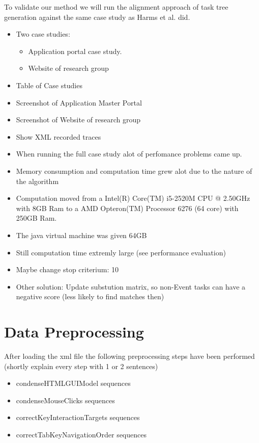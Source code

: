 To validate our method we will run the alignment approach of task tree generation against the same case study as Harms et al. did.

\begin{itemize}
	
	\item Two case studies: 
		\begin{itemize}
			\item Application portal case study. 
			\item Website of research group
		\end{itemize}
	\item Table of Case studies
	\item Screenshot of Application Master Portal
	\item Screenshot of Website of research group
	\item Show XML recorded traces
	\item When running the full case study alot of perfomance problems came up.
	\item Memory consumption and computation time grew alot due to the nature of the algorithm
	\item Computation moved from a Intel(R) Core(TM) i5-2520M CPU @ 2.50GHz with 8GB Ram to a AMD Opteron(TM) Processor 6276 (64 core) with 250GB Ram.
	\item The java virtual machine was given 64GB
	\item Still computation time extremly large (see performance evaluation)
	\item Maybe change stop criterium: 10%
	\item Other solution: Update substution matrix, so non-Event tasks can have a negative score (less likely to find matches then)
\end{itemize} 

\section{Data Preprocessing}
After loading the xml file the following preprocessing steps have been performed (shortly explain every step with 1 or 2 sentences)
\begin{itemize}
	\item condenseHTMLGUIModel sequences
	\item condenseMouseClicks sequences
	\item correctKeyInteractionTargets sequences
	\item correctTabKeyNavigationOrder sequences
\end{itemize}


